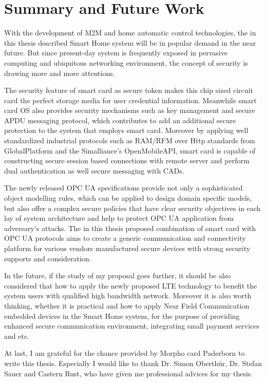 \chapter{Summary and Future Work}\label{secSummary}

With the development of M2M and home automatic control technologies, the in this thesis described Smart Home system will be in popular demand in the near future. But since present-day system is frequently exposed in pervasive computing and ubiquitous networking environment, the concept of security is drawing more and more attentions. 

The security feature of smart card as secure token makes this chip sized circuit card the perfect storage media for user credential information. Meanwhile smart card OS also provides security mechanisms such as key management and secure APDU messaging protocol, which contributes to add an additional secure protection to the system that employs smart card. Moreover by applying well standardized industrial protocols such as RAM/RFM over Http standards from GlobalPlatform and the Simalliance’s OpenMobileAPI, smart card is capable of constructing secure session based connections with remote server and perform dual authentication as well secure messaging with CADs.

The newly released OPC UA specifications provide not only a sophisticated object modelling rules, which can be applied to design domain specific models, but also offer a complex secure policies that have clear security objectives in each lay of system architecture and help to protect OPC UA application from adversary's attacks. 
The in this thesis proposed combination of smart card with OPC UA protocols aims to create a generic communication and connectivity platform for  various vendors manufactured secure devices with strong security supports and consideration. 

In the future, if the study of my proposal goes further, it should be also considered that how to apply the newly proposed LTE technology to benefit the system users with qualified high bandwidth network. Moreover it is also worth thinking, whether it is practical and how to apply Near Field Communication embedded devices in the Smart Home system, for the purpose of providing enhanced secure communication environment, integrating small payment services and etc.

At last, I am grateful for the chance provided by Morpho card Paderborn to write this thesis. Especially I would like to thank Dr. Simon Oberth\"ur, Dr. Stefan Sauer and Castern Rust, who have given me professional advices for my thesis.

 
